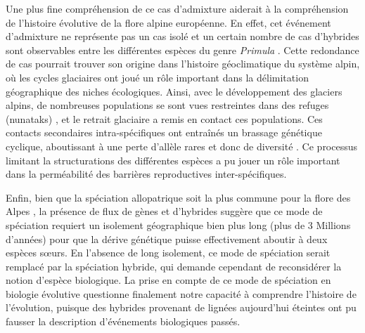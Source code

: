 \documentclass[../Master_report2.tex]{subfiles}
\begin{document}
Une plus fine compréhension de ce cas d'admixture aiderait à la compréhension de l'histoire évolutive de la flore alpine européenne. En effet, cet événement d'admixture ne représente pas un cas isolé et un certain nombre de cas d'hybrides sont observables entre les différentes espèces du genre \textit{Primula} \citep{Boucher2016a,Boucher2016,Schorr2012,Casazza2012,Kadereit2011}. Cette redondance de cas pourrait trouver son origine dans l'histoire géoclimatique du système alpin, où les cycles glaciaires ont joué un rôle important dans la délimitation géographique des niches écologiques. Ainsi, avec le développement des glaciers alpins, de nombreuses populations se sont vues restreintes dans des refuges (nunataks) \citep{Schneeweiss2011}, et le retrait glaciaire a remis en contact ces populations. Ces contacts secondaires intra-spécifiques ont entraînés un brassage génétique cyclique, aboutissant à une perte d'allèle rares et donc de diversité \citep{Schorr2012}. Ce processus limitant la structurations des différentes espèces a pu jouer un rôle important dans la perméabilité des barrières reproductives inter-spécifiques.

Enfin, bien que la spéciation allopatrique soit la plus commune pour la flore des Alpes \citep{Boucher2016}, la présence de flux de gènes et d'hybrides suggère que ce mode de spéciation requiert un isolement géographique bien plus long (plus de 3 Millions d'années) pour que la dérive génétique puisse effectivement aboutir à deux espèces sœurs. En l'absence de long isolement, ce mode de spéciation serait remplacé par la spéciation hybride, qui demande cependant de reconsidérer la notion d'espèce biologique. La prise en compte de ce mode de spéciation en biologie évolutive questionne finalement notre capacité à comprendre l'histoire de l'évolution, puisque des hybrides provenant de lignées aujourd'hui éteintes ont pu fausser la description d’événements biologiques passés.  

\end{document}
